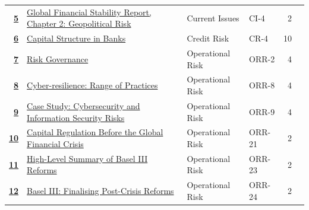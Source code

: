 \begin{longtable}{@{}r@{\hskip 7pt}L{6.35cm}@{\hskip 5pt}l@{\hskip 10pt}l@{\hskip 3pt}r@{\hskip 7pt}r@{}}
\hyperref[roi:5]{{\sffamily\bfseries\color{FRMGold}5}} & \hyperref[roi:5]{{\color{black}Global Financial Stability Report, Chapter 2: Geopolitical Risk}} & {\color{FRMGrey}Current Issues} & {\color{FRMGrey}CI-4} & {\color{FRMGrey}2} & \hyperref[roi:5]{{\sffamily\bfseries\color{FRMNavy}\pageref{roi:5}}} \\
\hyperref[roi:6]{{\sffamily\bfseries\color{FRMGold}6}} & \hyperref[roi:6]{{\color{black}Capital Structure in Banks}} & {\color{FRMGrey}Credit Risk} & {\color{FRMGrey}CR-4} & {\color{FRMGrey}10} & \hyperref[roi:6]{{\sffamily\bfseries\color{FRMNavy}\pageref{roi:6}}} \\
\hyperref[roi:7]{{\sffamily\bfseries\color{FRMGold}7}} & \hyperref[roi:7]{{\color{black}Risk Governance}} & {\color{FRMGrey}Operational Risk} & {\color{FRMGrey}ORR-2} & {\color{FRMGrey}4} & \hyperref[roi:7]{{\sffamily\bfseries\color{FRMNavy}\pageref{roi:7}}} \\
\hyperref[roi:8]{{\sffamily\bfseries\color{FRMGold}8}} & \hyperref[roi:8]{{\color{black}Cyber-resilience: Range of Practices}} & {\color{FRMGrey}Operational Risk} & {\color{FRMGrey}ORR-8} & {\color{FRMGrey}4} & \hyperref[roi:8]{{\sffamily\bfseries\color{FRMNavy}\pageref{roi:8}}} \\
\hyperref[roi:9]{{\sffamily\bfseries\color{FRMGold}9}} & \hyperref[roi:9]{{\color{black}Case Study: Cybersecurity and Information Security Risks}} & {\color{FRMGrey}Operational Risk} & {\color{FRMGrey}ORR-9} & {\color{FRMGrey}4} & \hyperref[roi:9]{{\sffamily\bfseries\color{FRMNavy}\pageref{roi:9}}} \\
\hyperref[roi:10]{{\sffamily\bfseries\color{FRMGold}10}} & \hyperref[roi:10]{{\color{black}Capital Regulation Before the Global Financial Crisis}} & {\color{FRMGrey}Operational Risk} & {\color{FRMGrey}ORR-21} & {\color{FRMGrey}2} & \hyperref[roi:10]{{\sffamily\bfseries\color{FRMNavy}\pageref{roi:10}}} \\
\hyperref[roi:11]{{\sffamily\bfseries\color{FRMGold}11}} & \hyperref[roi:11]{{\color{black}High-Level Summary of Basel III Reforms}} & {\color{FRMGrey}Operational Risk} & {\color{FRMGrey}ORR-23} & {\color{FRMGrey}2} & \hyperref[roi:11]{{\sffamily\bfseries\color{FRMNavy}\pageref{roi:11}}} \\
\hyperref[roi:12]{{\sffamily\bfseries\color{FRMGold}12}} & \hyperref[roi:12]{{\color{black}Basel III: Finalising Post-Crisis Reforms}} & {\color{FRMGrey}Operational Risk} & {\color{FRMGrey}ORR-24} & {\color{FRMGrey}2} & \hyperref[roi:12]{{\sffamily\bfseries\color{FRMNavy}\pageref{roi:12}}} \\

\end{longtable}
